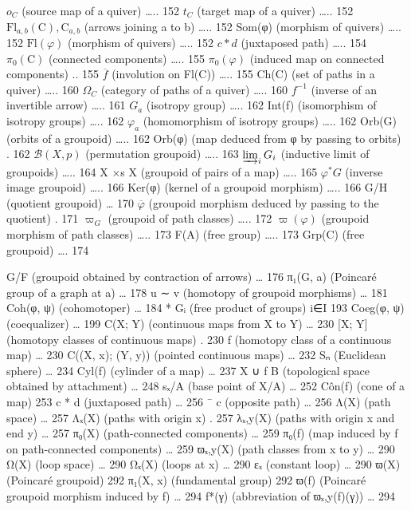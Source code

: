 \(o_{C}\) (source map of a quiver) \ldots.. 152 \(t_{C}\) (target map of a quiver) \ldots.. 152 \(\mathrm{Fl}_{a,b}(\mathrm{C}), \mathrm{C}_{a,b}\) (arrows joining a to b) \ldots.. 152 Som(φ) (morphism of quivers) \ldots.. 152 \(\mathrm{Fl}(\varphi)\) (morphism of quivers) \ldots.. 152 \(c*d\) (juxtaposed path) \ldots.. 154 \(\pi_{0}(\mathrm{C})\) (connected components) \ldots.. 155 \(\pi_{0}(\varphi)\) (induced map on connected components) .. 155 \(\overline{f}\) (involution on Fl(C)) \ldots.. 155 Ch(C) (set of paths in a quiver) \ldots.. 160 \(\Omega_{C}\) (category of paths of a quiver) \ldots.. 160 \(f^{-1}\) (inverse of an invertible arrow) \ldots.. 161 \(G_{a}\) (isotropy group) \ldots.. 162 Int(f) (isomorphism of isotropy groups) \ldots.. 162 \(\varphi_{a}\) (homomorphism of isotropy groups) \ldots.. 162 Orb(G) (orbits of a groupoid) \ldots.. 162 Orb(φ) (map deduced from φ by passing to orbits) . 162 \(\mathcal{B}(X,p)\) (permutation groupoid) \ldots.. 163 \(\varinjlim_{i}G_{i}\) (inductive limit of groupoids) \ldots.. 164 X ×s X (groupoid of pairs of a map) \ldots.. 165 \(\varphi^{*}G\) (inverse image groupoid) \ldots.. 166 Ker(φ) (kernel of a groupoid morphism) \ldots.. 166 G/H (quotient groupoid) \ldots{} 170 \(\overline{\varphi}\) (groupoid morphism deduced by passing to the quotient) . 171 \(\varpi_{G}\) (groupoid of path classes) \ldots.. 172 \(\varpi(\varphi)\) (groupoid morphism of path classes) \ldots.. 173 F(A) (free group) \ldots.. 173 Grp(C) (free groupoid) \ldots. 174

G/F (groupoid obtained by contraction of arrows) \ldots{} 176 π₁(G, a) (Poincaré group of a graph at a) \ldots{} 178 u ∼ v (homotopy of groupoid morphisms) \ldots{} 181 Coh(φ, ψ) (cohomotoper) \ldots{} 184 * Gᵢ (free product of groups) i∈I 193 Coeg(φ, ψ) (coequalizer) \ldots{} 199 C(X; Y) (continuous maps from X to Y) \ldots{} 230 {[}X; Y{]} (homotopy classes of continuous maps) . 230 f (homotopy class of a continuous map) \ldots{} 230 C((X, x); (Y, y)) (pointed continuous maps) \ldots{} 232 Sₙ (Euclidean sphere) \ldots{} 234 Cyl(f) (cylinder of a map) \ldots{} 237 X ∪ f B (topological space obtained by attachment) \ldots{} 248 sₓ/A (base point of X/A) \ldots{} 252 Côn(f) (cone of a map) 253 c * d (juxtaposed path) \ldots{} 256 ¯ c (opposite path) \ldots{} 256 Λ(X) (path space) \ldots{} 257 Λₓ(X) (paths with origin x) . 257 λₓ,y(X) (paths with origin x and end y) \ldots{} 257 π₀(X) (path-connected components) \ldots{} 259 π₀(f) (map induced by f on path-connected components) \ldots{} 259 ϖₓ,y(X) (path classes from x to y) \ldots{} 290 Ω(X) (loop space) \ldots{} 290 Ωₓ(X) (loops at x) \ldots{} 290 εₓ (constant loop) \ldots{} 290 ϖ(X) (Poincaré groupoid) 292 π₁(X, x) (fundamental group) 292 ϖ(f) (Poincaré groupoid morphism induced by f) \ldots{} 294 f*(γ) (abbreviation of ϖₓ,y(f)(γ)) \ldots{} 294


